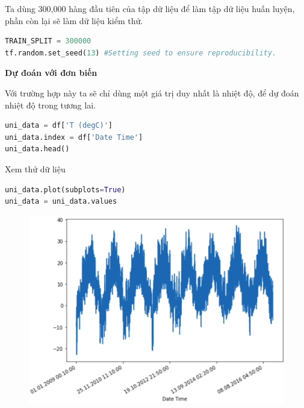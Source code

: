 \vspace{0.25cm}
\changefontsizes{13pt}
\setlength{\parindent}{0cm}
Ta dùng 300,000 hàng đầu tiên của tập dữ liệu để làm tập dữ liệu huấn luyện, phần còn lại sẽ làm dữ liệu kiểm thử.

\begin{lstlisting}[language=Python]
TRAIN_SPLIT = 300000
tf.random.set_seed(13) #Setting seed to ensure reproducibility.
\end{lstlisting}


\vspace{0.25cm}
\changefontsizes{14pt}
\setlength{\parindent}{0cm}
\textbf{Dự đoán với đơn biến}


\vspace{0.25cm}
\changefontsizes{13pt}
Với trường hợp này ta sẽ chỉ dùng một giá trị duy nhất là nhiệt độ, để dự đoán nhiệt độ trong tương lai.

\begin{lstlisting}[language=Python]
uni_data = df['T (degC)']
uni_data.index = df['Date Time']
uni_data.head()
\end{lstlisting}

Xem thử dữ liệu

\begin{lstlisting}[language=Python]
uni_data.plot(subplots=True)
uni_data = uni_data.values
\end{lstlisting}


\vspace{-1cm}
\begin{center}
	\begin{figure}[htp]
		\begin{center}
			\includegraphics[scale=0.3]{./images/1.png}
		\end{center}
	\end{figure}
\end{center}


